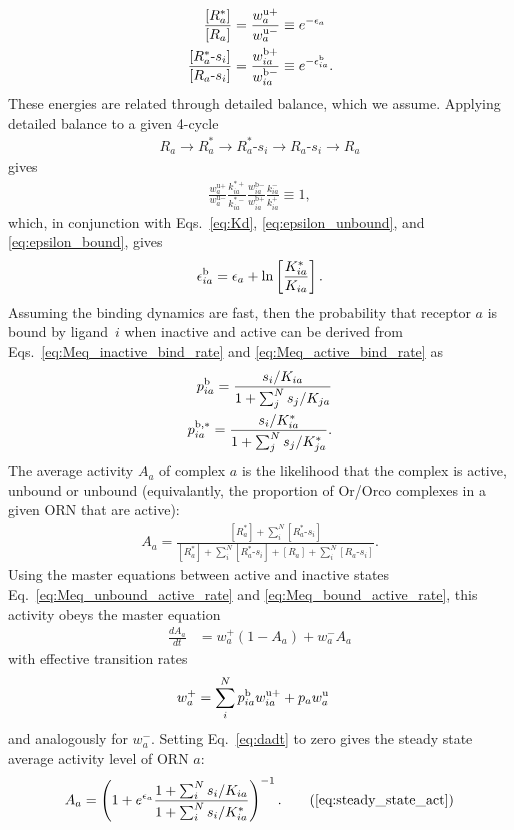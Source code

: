 \begin{align}
\frac{[R^*_a]}{[R_a]} &= \frac{w^{\text{u}+}_a}{w^{\text{u}-}_a} \equiv e^{-\epsilon_a} \label{eq:epsilon_unbound} \\
\frac{[R^*_a\text{-}s_i]}{[R_a\text{-}s_i]} &= \frac{w^{\text{b}+}_{ia}}{w^{\text{b}-}_{ia}} \equiv e^{-\epsilon^{\text b}_{ia}}.\label{eq:epsilon_bound}
\end{align}
These energies are related through detailed balance, which we assume. Applying detailed balance to a given 4-cycle 
\begin{align}
R_a \rightarrow R_a^* \rightarrow R_a^*\text{-}s_i \rightarrow R_a\text{-}s_i \rightarrow R_a
\end{align}
gives
\begin{align}
\frac{w^{\text{u}+}_a}{w^{\text{u}-}_a}\frac{k^{*+}_{ia}}{k^{*-}_{ia}}\frac{w^{\text{b}-}_{ia}}{w^{\text{b}+}_{ia}}\frac{k^{-}_{ia}}{k^{+}_{ia}} \equiv 1,
\label{eq:detailed_balance}
\end{align}
which, in conjunction with Eqs.~\ref{eq:Kd}, \ref{eq:epsilon_unbound}, and \ref{eq:epsilon_bound}, gives
\begin{align}
\epsilon_{ia}^{\text b} = \epsilon_a + \ln\left[\frac{K^*_{ia}}{K_{ia}}\right].
\label{testing_equation}
\end{align}
Assuming the binding dynamics are fast, then the probability that receptor $a$ is bound by ligand~$i$ when inactive and active can be derived from  Eqs.~\ref{eq:Meq_inactive_bind_rate} and \ref{eq:Meq_active_bind_rate} as
\begin{align}
p^{\text b}_{ia} = \frac{s_i/K_{ia}}{1 + \sum_j^Ns_j/K_{ja}} \label{eq:bound_prob_ai_inactive} \\
p^{\text b, *}_{ia} = \frac{s_i/K^*_{ia}}{1 + \sum_j^Ns_j/K^*_{ja}} \label{eq:bound_prob_ai_active}.
\end{align}
The average  activity $A_a$ of complex $a$ is the likelihood that the complex is active, unbound or unbound (equivalantly, the proportion of Or/Orco complexes in a given ORN that are active):
\begin{align}
A_a = \frac{[R^*_a] + \sum_i^N[R^*_a\text{-}s_i]}{[R^*_a] + \sum_i^N[R^*_a\text{-}s_i] + {[R_a] + \sum_i^N[R_a\text{-}s_i]}}.
\end{align} 
Using the master equations between active and inactive states Eq.~\ref{eq:Meq_unbound_active_rate} and \ref{eq:Meq_bound_active_rate}, this activity obeys the master equation
\begin{align}
\frac{dA_a}{dt} &= w^+_a(1 - A_a) + w^-_aA_a
\label{eq:dadt}
\end{align}
with effective transition rates
\begin{align}
w^+_a &= \sum_i^Np^{\text b}_{ia} w^{\text u +}_{ia} + p_{a}w^{\text u}_a 
\end{align}
and analogously for $w_a^-$. Setting Eq.~\ref{eq:dadt} to zero gives the steady state average activity level of ORN $a$:
\begin{align}
A_a = \left(1 + e^{\epsilon_a}\frac{1 + \sum_i^N s_i/K_{ia}}{1 + \sum_i^N s_i/K^*_{ia}}\right)^{-1}. \tag{\ref{eq:steady_state_act}}
\end{align}
	
